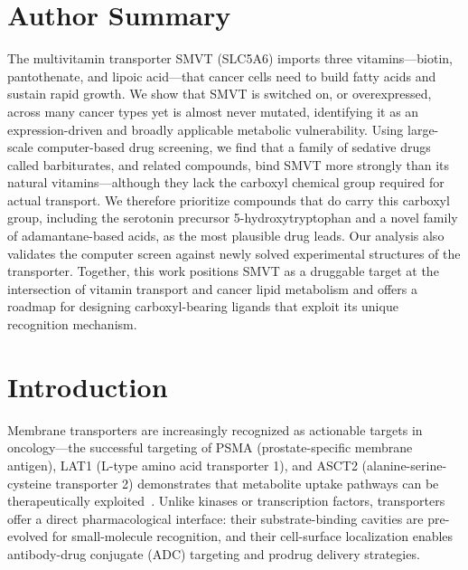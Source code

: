 \documentclass[10pt,letterpaper]{article}
\begin{document}
\section*{Author Summary}
The multivitamin transporter SMVT (SLC5A6) imports three vitamins---biotin, pantothenate, and lipoic acid---that cancer cells need to build fatty acids and sustain rapid growth. We show that SMVT is switched on, or overexpressed, across many cancer types yet is almost never mutated, identifying it as an expression-driven and broadly applicable metabolic vulnerability. Using large-scale computer-based drug screening, we find that a family of sedative drugs called barbiturates, and related compounds, bind SMVT more strongly than its natural vitamins---although they lack the carboxyl chemical group required for actual transport. We therefore prioritize compounds that do carry this carboxyl group, including the serotonin precursor 5-hydroxytryptophan and a novel family of adamantane-based acids, as the most plausible drug leads. Our analysis also validates the computer screen against newly solved experimental structures of the transporter. Together, this work positions SMVT as a druggable target at the intersection of vitamin transport and cancer lipid metabolism and offers a roadmap for designing carboxyl-bearing ligands that exploit its unique recognition mechanism.


\section*{Introduction}

Membrane transporters are increasingly recognized as actionable targets in oncology---the successful targeting of PSMA (prostate-specific membrane antigen), LAT1 (L-type amino acid transporter 1), and ASCT2 (alanine-serine-cysteine transporter 2) demonstrates that metabolite uptake pathways can be therapeutically exploited~\cite{hofman2020,kanai1998,geldermalsen2016}. Unlike kinases or transcription factors, transporters offer a direct pharmacological interface: their substrate-binding cavities are pre-evolved for small-molecule recognition, and their cell-surface localization enables antibody-drug conjugate (ADC) targeting and prodrug delivery strategies.
\end{document}
